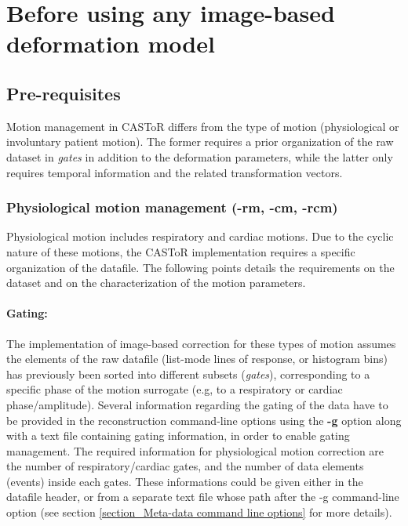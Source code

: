 \documentclass[a4paper, 11pt]{article}
\begin{document}
\clearpage
\section{Before using any image-based deformation model}

\subsection{Pre-requisites}
Motion management in CASToR differs from the type of motion (physiological or involuntary patient motion). The former requires a prior organization of the raw dataset in \textit{gates} in addition to the deformation parameters, while the latter only requires temporal information and the related transformation vectors.



\subsubsection{Physiological motion management (-rm, -cm, -rcm)}

Physiological motion includes respiratory and cardiac motions. Due to the cyclic nature of these motions, the CASToR implementation requires a specific organization of the datafile. The following points details the requirements on the dataset and on the characterization of the motion parameters.

\paragraph{Gating:} The implementation of image-based correction for these types of motion assumes the elements of the raw datafile (list-mode lines of response, or histogram bins) has previously been sorted into different subsets (\textit{gates}), corresponding to a specific phase of the motion surrogate (e.g, to a respiratory or cardiac phase/amplitude). Several information regarding the gating of the data have to be provided in the reconstruction command-line options using the \textbf{-g} option  along with a text file containing gating information, in order to enable gating management. The required information for physiological motion correction are the number of respiratory/cardiac gates, and the number of data elements (events) inside each gates. These informations could be given either in the datafile header, or from a separate text file whose path after the -g command-line option (see section \ref{section_Meta-data command line options} for more details). 
\end{document}
